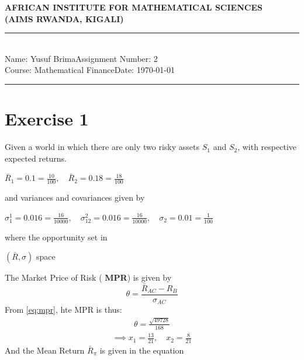 \documentclass[12pt,a4paper]{article}
\newcommand{\student}{Yusuf Brima}
\newcommand{\course}{Mathematical Finance}
\newcommand{\assignment}{2}
\begin{document}
\thispagestyle{empty}
\begin{center}
\textbf{AFRICAN INSTITUTE FOR MATHEMATICAL SCIENCES \\[0.5cm]
(AIMS RWANDA, KIGALI)}
\vspace{1.0cm}
\end{center}

\noindent
\rule{17cm}{0.2cm}\\[0.3cm]
Name: \student \hfill Assignment Number: \assignment\\[0.1cm]
Course: \course \hfill Date: \today\\
\rule{17cm}{0.05cm}
\vspace{1.0cm}
\section*{Exercise 1}
	Given a world in which there are only two risky assets $S_1$ and $S_2$, with respective expected returns.
	  \begin{spacing}{2.125}
		$
			\bar{R}_1  =  0.1  =  \frac{10}{100},	\quad \bar{R}_2  =  0.18  = \frac{18}{100}
		$
	\end{spacing}
  and variances and covariances given by
  \begin{spacing}{2.125}
  		  $
		\sigma^1_1  =  0.016  = \frac{16}{10000}, \quad \sigma_{12}^2 = 0.016  = \frac{16}{10000},\quad \sigma_2  =  0.01 =  \frac{1}{100}  
  $
  \end{spacing}
  where the opportunity set in
  \begin{spacing}{2.125}
  		 $\left(  \bar{R} ,  \sigma  \right)$ space
  \end{spacing}
The Market Price of Risk ( \textbf{MPR}) is given by 
  \begin{equation}
  		 		\theta  =  \frac{  \bar{ R}_{AC}  -  R_B }{ \sigma_{AC}}
  		 		\label{eq:mpr}
  \end{equation}
From \eqref{eq:mpr}, hte MPR is thus:
\begin{align*}
		\theta  =  \frac{\sqrt{49728}}{168}
\end{align*}
\begin{align*}
	\implies x_1  =  \frac{13}{21} ,  \quad x_2  =  \frac{8}{21}
\end{align*}
  And the Mean Return $\bar{R}_{\pi}$ is given in the equation 
\end{document}
